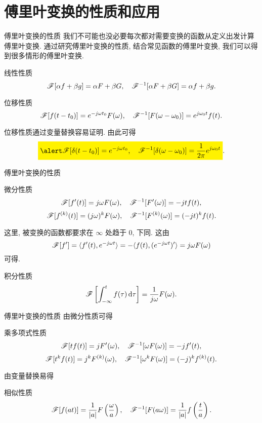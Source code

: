 \section{傅里叶变换的性质和应用}


\begin{frame}{傅里叶变换的性质}
\onslide<+->
我们不可能也没必要每次都对需要变换的函数从定义出发计算傅里叶变换.
\onslide<+->
通过研究傅里叶变换的性质, 结合常见函数的傅里叶变换, 我们可以得到很多情形的傅里叶变换.

\begin{block}{线性性质}
\[\mathscr{F}[\alpha f+\beta g]=\alpha F+\beta G,\quad
\mathscr{F}^{-1}[\alpha F+\beta G]=\alpha f+\beta g.\]
\end{block}
\vspace{-5pt}

\begin{block}{位移性质}
\[\mathscr{F}[f(t-t_0)]=e^{-j\omega t_0}F(\omega),\quad
\mathscr{F}^{-1}[F(\omega-\omega_0)]=e^{j\omega_0 t}f(t).\]
\vspace{-\baselineskip}
\end{block}
\onslide<+->
位移性质通过变量替换容易证明.
\onslide<+->
由此可得
\[\aboxeq{\msf[\delta(t-t_0)]=e^{-j\omega t_0},\quad
\msf^{-1}[\delta(\omega-\omega_0)]=\dfrac1{2\pi}e^{j\omega_0 t}}.\]
\end{frame}


\begin{frame}{傅里叶变换的性质}
\begin{block}{微分性质}
\[\mathscr{F}[f'(t)]=j\omega F(\omega),\quad
\mathscr{F}^{-1}[F'(\omega)]=-jtf(t),\]
\onslide<+->
\vspace{-\baselineskip}
\[\mathscr{F}[f^{(k)}(t)]=(j\omega)^k F(\omega),\quad
\mathscr{F}^{-1}[F^{(k)}(\omega)]=(-jt)^kf(t).\]
\end{block}
\onslide<+->
这里, 被变换的函数都要求在 $\infty$ 处趋于 $0$, 下同. 
\onslide<+->
这由
\[\mathscr{F}[f']=\langle{f'(t),e^{-j\omega t}}\rangle=-\langle{f(t),(e^{-j\omega t})'}\rangle=j\omega F(\omega)\]
可得.

\begin{block}{积分性质}
\[\mathscr{F}\left[\int_{-\infty}^t f(\tau)\,\mathrm{d}\tau\right]=\frac1{j\omega}F(\omega).\]
\end{block}
\end{frame}


\begin{frame}{傅里叶变换的性质}
由微分性质可得
\begin{block}{乘多项式性质}
\[\mathscr{F}[tf(t)]=jF'(\omega),\quad
\mathscr{F}^{-1}[\omega F(\omega)]=-jf'(t),\]
\onslide<+->
\[\mathscr{F}[t^kf(t)]=j^kF^{(k)}(\omega),\quad
\mathscr{F}^{-1}[\omega^kF(\omega)]=(-j)^kf^{(k)}(t).\]
\end{block}
\onslide<+->
由变量替换易得
\begin{block}{相似性质}
\[\mathscr{F}[f(at)]=\frac1{|a|}F\left(\frac\omega a\right),\quad
\mathscr{F}^{-1}[F(a\omega)]=\frac1{|a|}f\left(\frac t a\right).\]
\end{block}
\end{frame}


